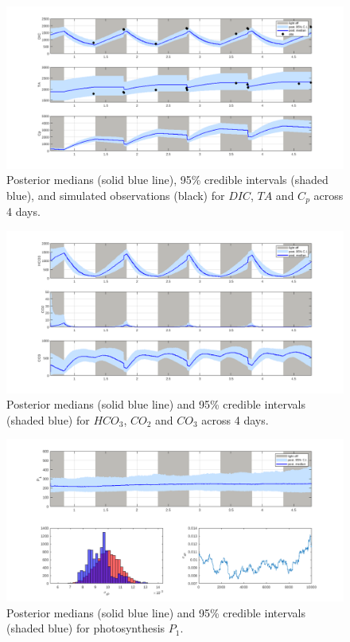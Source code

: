 \documentclass{ruthesis}
\begin{document}
\begin{figure}
	\centerline{\includegraphics[width=1.2\textwidth]{images_microalgae/plots_iterative/DIC_TA_Cp}}
	\caption[.]{Posterior medians (solid blue line), 95\% credible intervals (shaded blue), and simulated observations (black) for $DIC$, $TA$ and $C_p$ across 4 days.}
	\label{fig:micro_exp_iterative_DIC_TA_Cp}
\end{figure}

\begin{figure}
	\centerline{\includegraphics[width=1.2\textwidth]{images_microalgae/plots_iterative/carbon}}
	\caption[.]{Posterior medians (solid blue line) and 95\% credible intervals (shaded blue) for $HCO_3$, $CO_2$ and $CO_3$ across 4 days.}
	\label{fig:micro_exp_iterative_carbon}
\end{figure}

\begin{figure}
	\centerline{\includegraphics[width=1.2\textwidth]{images_microalgae/plots_iterative/P}}
	\caption[.]{Posterior medians (solid blue line) and 95\% credible intervals (shaded blue) for photosynthesis $P_1$.}
	\label{fig:micro_exp_iterative_P}
\end{figure}
\end{document}
